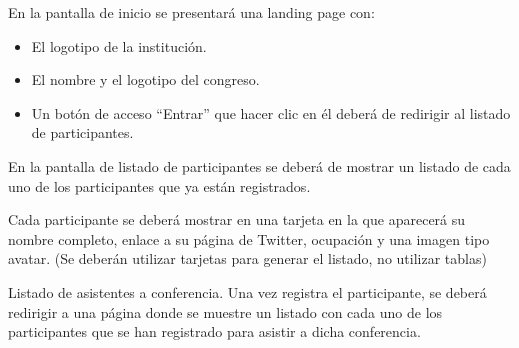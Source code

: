 \begin{list}{RNF\_\IncReq\thecRequerimientos}{}
	\item En la pantalla de inicio se presentará una landing page con:
	\begin{itemize}
		\item El logotipo de la institución.
		\item El nombre y el logotipo del congreso.
		\item Un botón de acceso ``Entrar'' que hacer clic en él deberá de redirigir al listado de participantes.
	\end{itemize}
	
	\item En la pantalla de listado de participantes se deberá de mostrar un listado de cada uno de los participantes que ya están registrados. 
	
	Cada participante se deberá mostrar en una tarjeta en la que aparecerá su nombre completo, enlace a su página de Twitter, ocupación y una imagen tipo avatar.
	(Se deberán utilizar tarjetas para generar el listado, no utilizar tablas)
	
	\item Listado de asistentes a conferencia. Una vez registra el participante, se deberá redirigir a una página donde se muestre un listado con cada uno de los participantes que se han registrado para asistir a dicha conferencia.
\end{list}
